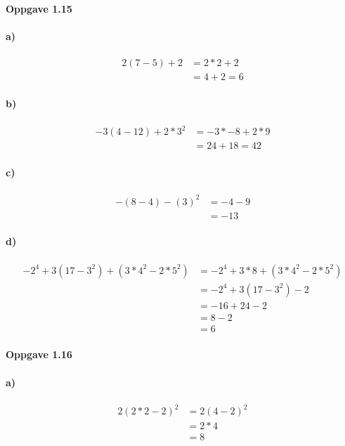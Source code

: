 \documentclass{article}
\begin{document}
\paragraph{Oppgave 1.15}

\paragraph{a)}
\begin{align*}
  2 (7 - 5) + 2 &= 2 * 2 + 2\\
  &= 4 + 2 = 6
\end{align*}

\paragraph{b)}
\begin{align*}
  -3(4-12)+2*3^2 &= -3 * -8 + 2 * 9\\
&= 24 + 18 = 42
\end{align*}

\paragraph{c)}
\begin{align*}
  -(8-4)-(3)^2 &= -4 - 9\\
&= -13
\end{align*}

\paragraph{d)}
\begin{align*}
  -2^4 + 3(17 - 3^2) + (3 * 4^2 - 2 * 5^2) &= -2^4 + 3 * 8 + (3*4^2-2*5^2)\\
  &= -2^4+3(17-3^2) - 2\\
  &=  -16 + 24 - 2\\
  &= 8 - 2\\
  &= 6
\end{align*}

\paragraph{Oppgave 1.16}
\paragraph{a)}
\begin{align*}
  2(2 * 2 - 2)^2 &= 2(4 -2)^2\\
&= 2 * 4\\
&= 8
\end{align*}
\end{document}
